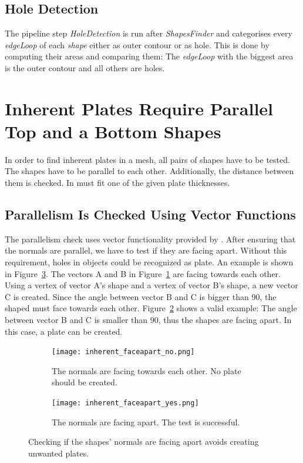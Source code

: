 \documentclass[../ClassicThesis.tex]{subfiles}
\begin{document}
\subsection{Hole Detection}\label{sub:holedetection}

The pipeline step \emph{HoleDetection} is run after \emph{ShapesFinder} and categorises every \emph{edgeLoop} of each \emph{shape} either as outer contour or as hole. This is done by computing their areas and comparing them: The \emph{edgeLoop} with the biggest area is the outer contour and all others are holes.



\section{Inherent Plates Require Parallel Top and a Bottom Shapes}\label{sec:inherentplates}

In order to find inherent plates in a mesh, all pairs of shapes have to be tested. The shapes have to be parallel to each other. Additionally, the distance between them is checked. In must fit one of the given plate thicknesses.

\subsection{Parallelism Is Checked Using Vector Functions}

The parallelism check uses vector functionality provided by \threejs{}. After ensuring that the normals are parallel, we have to test if they are facing apart. Without this requirement, holes in objects could be recognized as plate. An example is shown in Figure~\ref{fig:inherent_faceapart}. The vectors A and B in Figure~\ref{fig:inherent_faceapart:no} are facing towards each other. Using a vertex of vector A's shape and a vertex of vector B's shape, a new vector C is created. Since the angle between vector B and C is bigger than 90\textdegree{}, the shaped must face towards each other. Figure~\ref{fig:inherent_faceapart:yes} shows a valid example: The angle between vector B and C is smaller than 90{\textdegree}, thus the shapes are facing apart. In this case, a plate can be created.

\begin{figure}
  \centering
  \begin{subfigure}[t]{0.49\textwidth}
    \centering
    \texttt{[image: inherent\_faceapart\_no.png]}
    \caption{The normals are facing towards each other. No plate should be created.}
    \label{fig:inherent_faceapart:no}
  \end{subfigure}
  \begin{subfigure}[t]{0.49\textwidth}
    \centering
    \texttt{[image: inherent\_faceapart\_yes.png]}
    \caption{The normals are facing apart. The test is successful.}
    \label{fig:inherent_faceapart:yes}
  \end{subfigure}
  \caption{Checking if the shapes' normals are facing apart avoids creating unwanted plates.}
  \label{fig:inherent_faceapart}
\end{figure}
\end{document}
